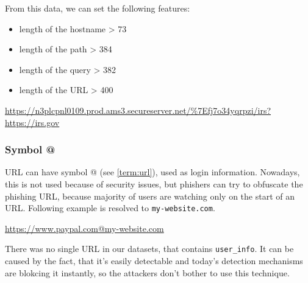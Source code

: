 \documentclass[
  digital, %
  oneside, %
  table,   %
  nolof,     %
  nolot,     %
]{fithesis3}
\newcounter{feature}
\newenvironment{feature}[1]{\stepcounter{feature}%
    \tcolorbox[beamer,%
    noparskip,breakable,
    colback=LightBlue,colframe=DarkBlue,%
    colbacklower=DarkBlue!75!LightBlue,%
    title=Feature~\thefeature: #1]}%
    {\endtcolorbox}
\begin{document}
From this data, we can set the following features:
\begin{itemize}
    \item length of the hostname > 73
    \item length of the path > 384
    \item length of the query > 382
    \item length of the URL > 400
\end{itemize}

\begin{feature}{Length of the URL}
\url{https://n3plcpnl0109.prod.ams3.secureserver.net/\%7Efj7o34yqrpzi/irs?https://irs.gov}
\end{feature}





\subsubsection{Symbol @ \cite{url-features-work} \cite{cantina} \cite{fresh-phish}}

URL can have symbol @ (see \ref{term:url}), used as login information. Nowadays, this is not used because of security issues, but phishers can try to obfuscate the phishing URL, because majority of users are watching only on the start of an URL. Following example is resolved to \texttt{my-website.com}.

\begin{feature}{Symbol @}
\url{https://www.paypal.com@my-website.com}
\end{feature}

There was no single URL in our datasets, that contains \texttt{user\_info}. It can be caused by the fact, that it's easily detectable and today's detection mechanisms are blokcing it instantly, so the attackers don't bother to use this technique. 




\end{document}
